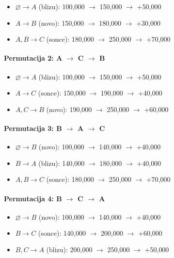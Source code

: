 \begin{itemize}
    \item \(\varnothing \rightarrow A\) (blizu): 100{,}000 \(\rightarrow\) 150{,}000 \(\rightarrow\) +50{,}000
    \item \(A \rightarrow B\) (novo): 150{,}000 \(\rightarrow\) 180{,}000 \(\rightarrow\) +30{,}000
    \item \(A,B \rightarrow C\) (sonce): 180{,}000 \(\rightarrow\) 250{,}000 \(\rightarrow\) +70{,}000
\end{itemize}

\paragraph{Permutacija 2: A \(\rightarrow\) C \(\rightarrow\) B}

\begin{itemize}
    \item \(\varnothing \rightarrow A\) (blizu): 100{,}000 \(\rightarrow\) 150{,}000 \(\rightarrow\) +50{,}000
    \item \(A \rightarrow C\) (sonce): 150{,}000 \(\rightarrow\) 190{,}000 \(\rightarrow\) +40{,}000
    \item \(A,C \rightarrow B\) (novo): 190{,}000 \(\rightarrow\) 250{,}000 \(\rightarrow\) +60{,}000
\end{itemize}

\paragraph{Permutacija 3: B \(\rightarrow\) A \(\rightarrow\) C}

\begin{itemize}
    \item \(\varnothing \rightarrow B\) (novo): 100{,}000 \(\rightarrow\) 140{,}000 \(\rightarrow\) +40{,}000
    \item \(B \rightarrow A\) (blizu): 140{,}000 \(\rightarrow\) 180{,}000 \(\rightarrow\) +40{,}000
    \item \(A,B \rightarrow C\) (sonce): 180{,}000 \(\rightarrow\) 250{,}000 \(\rightarrow\) +70{,}000
\end{itemize}

\paragraph{Permutacija 4: B \(\rightarrow\) C \(\rightarrow\) A}

\begin{itemize}
    \item \(\varnothing \rightarrow B\) (novo): 100{,}000 \(\rightarrow\) 140{,}000 \(\rightarrow\) +40{,}000
    \item \(B \rightarrow C\) (sonce): 140{,}000 \(\rightarrow\) 200{,}000 \(\rightarrow\) +60{,}000
    \item \(B,C \rightarrow A\) (blizu): 200{,}000 \(\rightarrow\) 250{,}000 \(\rightarrow\) +50{,}000
\end{itemize}


